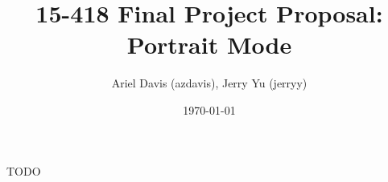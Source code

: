 \documentclass[12pt]{article}
\author{Ariel Davis (azdavis), Jerry Yu (jerryy)}
\date{\today}
\title{15-418 Final Project Proposal: Portrait Mode}
\begin{document}
\maketitle

TODO
\end{document}
